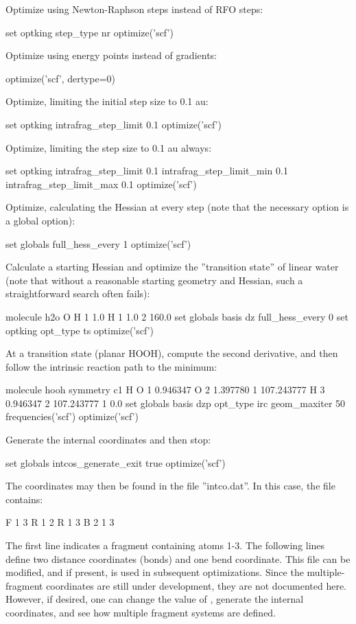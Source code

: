 Optimize using Newton-Raphson steps instead of RFO steps:
\begin{Snippet}
set optking step_type nr
optimize('scf')
\end{Snippet}

Optimize using energy points instead of gradients:
\begin{Snippet}
optimize('scf', dertype=0)
\end{Snippet}

Optimize, limiting the initial step size to 0.1 au:
\begin{Snippet}
set optking intrafrag_step_limit 0.1
optimize('scf')
\end{Snippet}

Optimize, limiting the step size to 0.1 au always: 
\begin{Snippet}
set optking {
  intrafrag_step_limit     0.1
  intrafrag_step_limit_min 0.1
  intrafrag_step_limit_max 0.1
}
optimize('scf')
\end{Snippet}

Optimize, calculating the Hessian at every step (note that the necessary option is a global option):
\begin{Snippet}
set globals full_hess_every 1
optimize('scf')
\end{Snippet}

Calculate a starting Hessian and optimize the ''transition state'' of
linear water (note that without a reasonable starting geometry and
Hessian, such a straightforward search often fails):
\begin{Snippet}
molecule h2o {
   O
   H 1 1.0
   H 1 1.0 2 160.0
}
set globals {
 basis dz
 full_hess_every 0
}
set optking opt_type ts
optimize('scf')
\end{Snippet}

At a transition state (planar HOOH), compute the second derivative, and
then follow the intrinsic reaction path to the minimum:
\begin{Snippet}
molecule hooh {
 symmetry c1
 H
 O 1 0.946347
 O 2 1.397780 1  107.243777
 H 3 0.946347 2  107.243777   1 0.0
}
set globals {
 basis dzp
 opt_type irc
 geom_maxiter 50
}
frequencies('scf')
optimize('scf')
\end{Snippet}

Generate the internal coordinates and then stop:
\begin{Snippet}
set globals intcos_generate_exit true
optimize('scf')
\end{Snippet}
The coordinates may then be found in the file ''intco.dat''.  In this case, the file contains:
\begin{Snippet}
F 1 3
R      1     2
R      1     3
B      2     1     3
\end{Snippet}
The first line indicates a fragment containing atoms 1-3.  The following lines define
two distance coordinates (bonds) and one bend coordinate.  This file can be modified, and if present,
is used in subsequent optimizations.  Since the multiple-fragment coordinates are still under
development, they are not documented here.  However, if desired, one can change the value
of , generate the internal coordinates, and see how multiple
fragment systems are defined.

